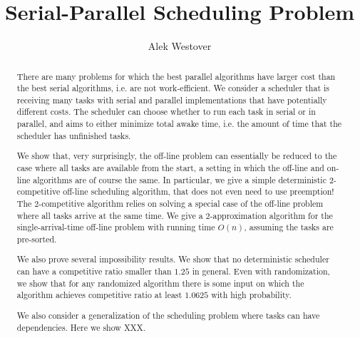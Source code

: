 \documentclass[twocolumn]{article}[10pt]
\author{Alek Westover}
\title{Serial-Parallel Scheduling Problem}
\begin{document}
\maketitle

\begin{abstract}
There are many problems for which the best parallel algorithms
have larger cost than the best serial algorithms, i.e. are not
work-efficient. We consider a scheduler that is receiving many
tasks with serial and parallel implementations that have
potentially different costs. The scheduler can choose whether to
run each task in serial or in parallel, and aims to either
minimize total awake time, i.e. the amount of time that the
scheduler has unfinished tasks. 

We show that, very surprisingly, the off-line problem can
essentially be reduced to the case where all tasks are available
from the start, a setting in which the off-line and on-line
algorithms are of course the same. In particular, we give a
simple deterministic $2$-competitive off-line scheduling
algorithm, that does not even need to use preemption! The
$2$-competitive algorithm relies on solving a special case of the
off-line problem where all tasks arrive at the same time. We give
a $2$-approximation algorithm for the single-arrival-time
off-line problem with running time $O(n)$, assuming the tasks are pre-sorted.

We also prove several impossibility results.
We show that no deterministic scheduler can have a
competitive ratio smaller than $1.25$ in general.
Even with randomization, we show that for any randomized
algorithm there is some input on which the algorithm achieves
competitive ratio at least $1.0625$ with high probability.

We also consider a generalization of the scheduling problem where
tasks can have dependencies. Here we show XXX.
\end{abstract}








\end{document}
